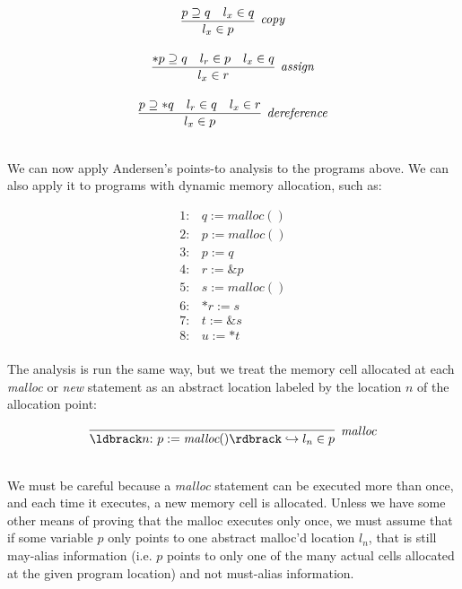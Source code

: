 \documentclass[11pt]{article}
\begin{document}

\[
\begin{array}{c}
\infer[\textit{copy}]
	{l_x \in p}
	{p \supseteq q & l_x \in q}\\[3ex]
		
\infer[\textit{assign}]
	{l_x \in r}
	{*p \supseteq q & l_r \in p & l_x \in q}\\[3ex]
	
\infer[\textit{dereference}]
	{l_x \in p}
	{p \supseteq *q & l_r \in q & l_x \in r}\\[3ex]
	
\end{array}
\]



We can now apply Andersen's points-to analysis to the programs above. 
%
We can also apply it to programs with dynamic memory allocation, such as:

\[
\begin{array}{ll}
1: & q := \textit{malloc}()\\
2: & p := \textit{malloc}()\\
3: & p := q\\
4: & r := \&p\\
5: & s := \textit{malloc}()\\
6: & *r := s\\
7: & t := \&s\\
8: & u := *t\\
\end{array}
\]

The analysis is run the same way, but we treat the memory cell allocated at each
\textit{malloc} or \textit{new} statement as an abstract location labeled by the
location $n$ of the allocation point:

\[
\begin{array}{c}
\infer[\textit{malloc}]
	{\parg{n{:}~ p := \textit{malloc}()} \hookrightarrow l_n \in p}
	{}\\[3ex]
	
\end{array}
\]

We must be careful because a \textit{malloc} statement can be executed more than
once, and each time it executes, a new memory cell is allocated. Unless we have
some other means of proving that the malloc executes only once, we must assume
that if some variable $p$ only points to one abstract malloc'd location $l_n$,
that is still may-alias information (i.e. $p$ points to only one of the many
actual cells allocated at the given program location) and not must-alias
information.
\end{document}
